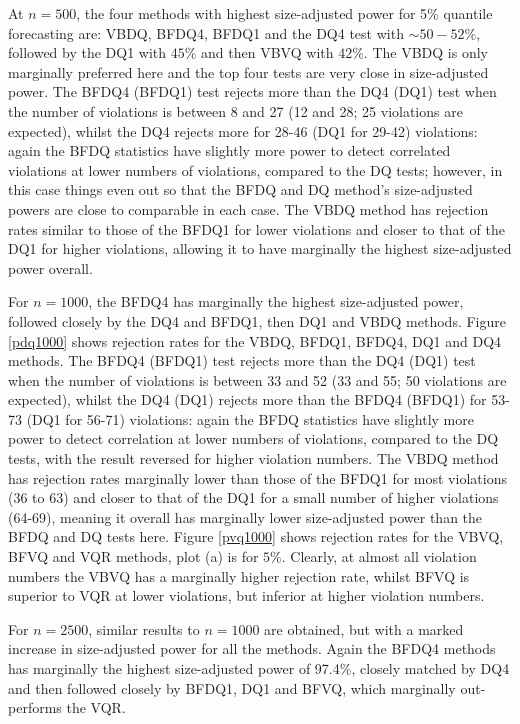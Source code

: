 \documentclass[12pt,epsf]{article}
\begin{document}
At $n=500$, the four methods with highest size-adjusted power for 5\% quantile forecasting are: VBDQ, BFDQ4, BFDQ1 and the DQ4 test
with $\sim 50-52\%$, followed by the DQ1 with $45\%$ and then VBVQ with $42\%$. The VBDQ is only marginally preferred here and the
top four tests are very close in size-adjusted power. The BFDQ4 (BFDQ1) test rejects more than the DQ4 (DQ1) test when the number
of violations is between 8 and 27 (12 and 28; 25 violations are expected), whilst the DQ4 rejects more for 28-46 (DQ1 for 29-42)
violations: again the BFDQ statistics have slightly more power to detect correlated violations at lower numbers of violations, compared to
the DQ tests; however, in this case things even out so that the BFDQ and DQ method's size-adjusted powers are close to comparable
in each case. The VBDQ method has rejection rates similar to those of the BFDQ1 for lower violations and closer to that of
the DQ1 for higher violations, allowing it to have marginally the highest size-adjusted power overall.

For $n=1000$, the BFDQ4 has marginally the highest size-adjusted power, followed closely by the DQ4 and BFDQ1, then
DQ1 and VBDQ methods. Figure \ref{pdq1000} shows rejection rates for the VBDQ, BFDQ1, BFDQ4, DQ1 and DQ4 methods.
The BFDQ4 (BFDQ1) test rejects more than the DQ4 (DQ1) test when the number of violations is between
33 and 52 (33 and 55; 50 violations are expected), whilst the DQ4 (DQ1) rejects more than the BFDQ4 (BFDQ1) for 53-73 (DQ1 for 56-71)
violations: again the BFDQ statistics have slightly more power to detect correlation at lower numbers of violations, compared to the
DQ tests, with the result reversed for higher violation numbers. The VBDQ method has rejection rates marginally lower than
those of the BFDQ1 for most violations (36 to 63) and closer to that of the DQ1 for a small number of higher violations (64-69),
meaning it overall has marginally lower size-adjusted power than the BFDQ and DQ tests here. Figure \ref{pvq1000} shows rejection
rates for the VBVQ, BFVQ and VQR methods, plot (a) is for $5\%$. Clearly, at almost all violation numbers the VBVQ has a
marginally higher rejection rate, whilst BFVQ is superior to VQR at lower violations, but inferior at higher violation numbers.

For $n=2500$, similar results to $n=1000$ are obtained, but with a marked increase in size-adjusted power for all the
methods. Again the BFDQ4 methods has marginally the highest size-adjusted power of 97.4\%,
closely matched by DQ4 and then followed closely by BFDQ1, DQ1 and BFVQ, which marginally out-performs the VQR.
\end{document}
